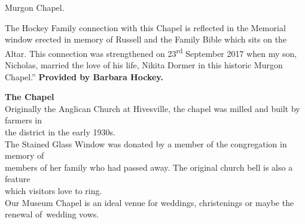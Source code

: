 Murgon Chapel.

The Hockey Family connection with this Chapel is reflected in the
Memorial window erected in memory of Russell and the Family Bible which
sits on the Altar. This connection was strengthened on
23\textsuperscript{rd} September 2017 when my son, Nicholas, married the
love of his life, Nikita Dormer in this historic Murgon Chapel.''
\textbf{Provided by Barbara Hockey.}


\textbf{The Chapel}\\
Originally the Anglican Church at Hivesville, the chapel was milled and
built by farmers in\\
the district in the early 1930s.\\
The Stained Glass Window was donated by a member of the congregation in
memory of\\
members of her family who had passed away. The original church bell is
also a feature\\
which visitors love to ring.\\
Our Museum Chapel is an ideal venue for weddings, christenings or maybe
the renewal of~wedding vows.


